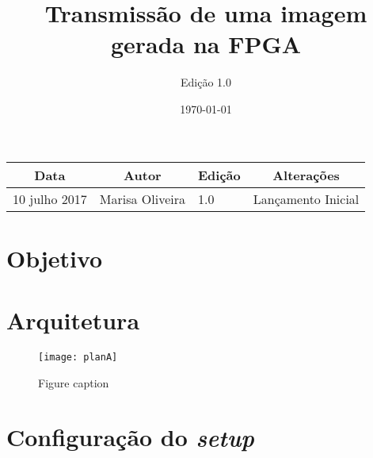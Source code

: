 \documentclass[11pt,a4paper, twoside,openright]{article}
\title{Transmissão de uma imagem gerada na FPGA} %
\author{Edição 1.0}
\date{\today} %
\begin{document}
\maketitle %

\begin{table}[h!]
	\centering
	\label{my-label}
	\begin{tabular}{@{}llll@{}}
		\toprule
		\multicolumn{1}{c}{\textbf{Data}} & \multicolumn{1}{c}{\textbf{Autor}} & \multicolumn{1}{c}{\textbf{Edição}} & \multicolumn{1}{c}{\textbf{Alterações}} \\ \midrule
		10 julho 2017                     & Marisa Oliveira                    & 1.0                                 & Lançamento Inicial                       \\ \bottomrule
	\end{tabular}
\end{table}



\section{Objetivo}
\section{Arquitetura}


\begin{figure}[h]
	\begin{center}
		\texttt{[image: planA]} 
		\caption{Figure caption}
	\end{center}
\end{figure}
\section{Configuração do \textit{setup}}









\end{document}

